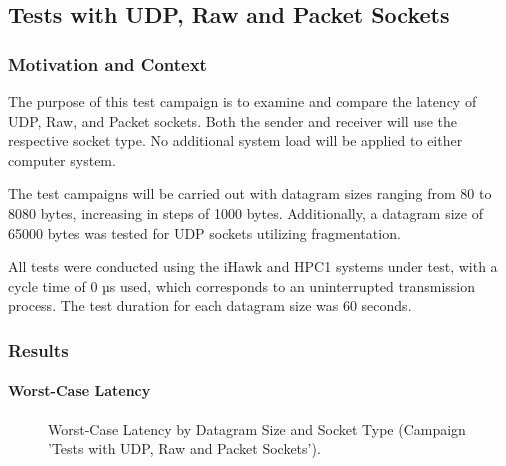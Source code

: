 \subsection{Tests with UDP, Raw and Packet Sockets} \label{chap:PerfSockType}
\subsubsection{Motivation and Context}
The purpose of this test campaign is to examine and compare the latency of UDP, Raw, and Packet sockets. Both the sender and receiver will use the respective socket type. No additional system load will be applied to either computer system.

The test campaigns will be carried out with datagram sizes ranging from 80 to 8080 bytes, increasing in steps of 1000 bytes. Additionally, a datagram size of 65000 bytes was tested for UDP sockets utilizing fragmentation.

All tests were conducted using the iHawk and HPC1 systems under test, with a cycle time of 0 µs used, which corresponds to an uninterrupted transmission process. The test duration for each datagram size was 60 seconds.

\subsubsection{Results}
\paragraph{Worst-Case Latency}

\begin{figure}[h!]
  \centering
  \caption{Worst-Case Latency by Datagram Size and Socket Type (Campaign 'Tests with UDP, Raw and Packet Sockets').}
  \label{fig:SockTypeWc}
\end{figure}

